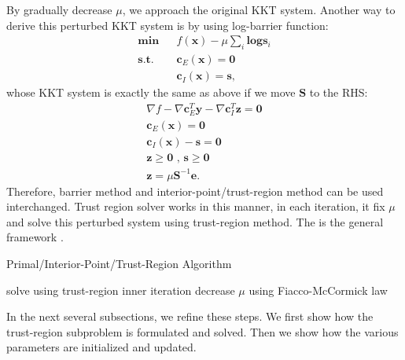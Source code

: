 \documentclass[annual]{acmsiggraph}
\newcommand{\E}[1]{\mathbf{#1}}
\begin{document}
By gradually decrease $\mu$, we approach the original KKT system. Another way to derive this perturbed KKT system is by using log-barrier function:
\begin{eqnarray*}
\E{min}&&f(\E{x})-\mu\sum_i\E{log}\E{s}_i	\\
\E{s.t.}&&\E{c}_E(\E{x})=\E{0}	\\
&&\E{c}_I(\E{x})=\E{s},
\end{eqnarray*}
whose KKT system is exactly the same as above if we move $\E{S}$ to the RHS:
\begin{subequations}
\label{pb:BARRIER_KKT}
\begin{align}
\nabla f-\nabla\E{c}_E^T\E{y}-\nabla\E{c}_I^T\E{z}=\E{0}	\\
\E{c}_E(\E{x})=\E{0}	\\
\E{c}_I(\E{x})-\E{s}=\E{0}	\\
\E{z} \geq \E{0} \text{ , } \E{s} \geq \E{0}	\\
\E{z}=\mu \E{S}^{-1} \E{e}.
\end{align}
\end{subequations}
Therefore, barrier method and interior-point/trust-region method can be used interchanged. Trust region solver works in this manner, in each iteration, it fix $\mu$ and solve this perturbed system using trust-region method. The is the general framework .
\begin{algorithm}[h]
\caption{Primal/Interior-Point/Trust-Region Algorithm}
\label{alg:MAIN_ALG}
\begin{algorithmic}
\STATE solve  using trust-region inner iteration
\STATE decrease $\mu$ using Fiacco-McCormick law
\ENDWHILE
\end{algorithmic}
\end{algorithm}
In the next several subsections, we refine these steps. We first show how the trust-region subproblem is formulated and solved. Then we show how the various parameters are initialized and updated.
\end{document}
